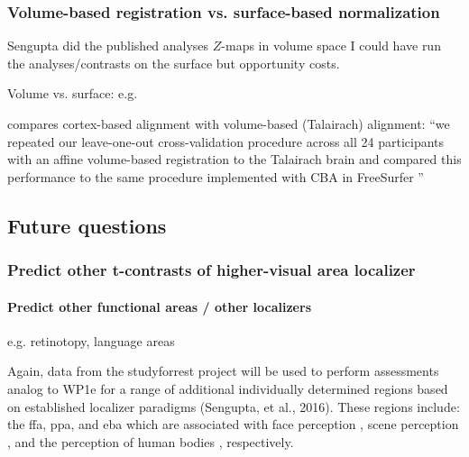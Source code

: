 \subsubsection{Volume-based registration vs. surface-based normalization}

%
Sengupta did the published analyses $Z$-maps in volume space
%
I could have run the analyses/contrasts on the surface but opportunity costs.
%

Volume vs. surface: e.g. \citep{desai2005volumetric}

\citep{weiner2018defining} compares cortex-based alignment
\citep{fischl1999high} with volume-based (Talairach) alignment: ``we repeated
our leave-one-out cross-validation procedure across all 24 participants with an
affine volume-based registration to the Talairach brain and compared this
performance to the same procedure implemented with CBA in FreeSurfer
\citep{weiner2018defining}''




\subsection{Future questions}

\subsubsection{Predict other t-contrasts of higher-visual area localizer}


\paragraph{Predict other functional areas / other localizers}


e.g. retinotopy, language areas

%
Again, data from the studyforrest project will be used to perform assessments
analog to WP1e for a range of additional individually determined regions based
on established localizer paradigms (Sengupta, et al., 2016).
%
These regions include: the \ac{ffa}, \ac{ppa}, and \ac{eba}  which are
associated with face perception \citep{kanwisher1997ffa,
pitcher2011occipitalfacearea}, scene perception \citep{epstein1998ppa}, and the
perception of human bodies \citep{downing2001bodyarea}, respectively.

